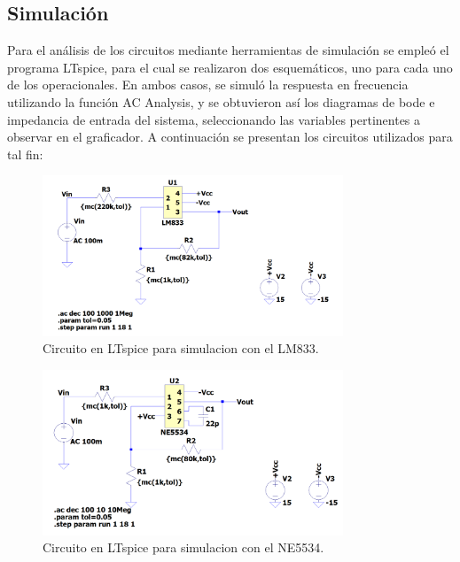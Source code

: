 \subsection{Simulación}
Para el análisis de los circuitos mediante herramientas de simulación se empleó el programa LTspice, para el cual se realizaron dos esquemáticos, uno para cada uno de los operacionales.
En ambos casos, se simuló la respuesta en frecuencia utilizando la función AC Analysis, y se obtuvieron así los diagramas de bode e impedancia de entrada del sistema, seleccionando las variables pertinentes a observar en el graficador.
A continuación se presentan los circuitos utilizados para tal fin:
\begin{figure}[H]
    \begin{minipage}{\textwidth}
        \centering
        \includegraphics[width=0.8\textwidth]{../EJ2/recursos_para_el_informe/LM833_Spice}
        \caption{Circuito en LTspice para simulacion con el LM833.}
        \label{fig:LM833_Spice}
    \end{minipage}\hfill
\end{figure}
\begin{figure}[H]
    \begin{minipage}{\textwidth}
        \centering
        \includegraphics[width=0.8\textwidth]{../EJ2/recursos_para_el_informe/NE5534_Spice}
        \caption{Circuito en LTspice para simulacion con el NE5534.}
        \label{fig:NE5534_Spice}
    \end{minipage}\hfill
\end{figure}


